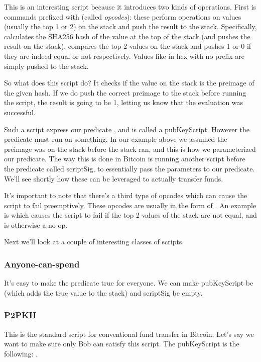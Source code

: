 This is an interesting script because it introduces two kinds of operations. First is commands prefixed with  (called \emph{opcodes}): these perform operations on values (usually the top 1 or 2) on the stack and push the result to the stack. Specifically,  calculates the SHA256 hash of the value at the top of the stack (and pushes the result on the stack).  compares the top 2 values on the stack and pushes 1 or 0 if they are indeed equal or not respectively. Values like  in hex with no  prefix are simply pushed to the stack.


So what does this script do? It checks if the value on the stack is the preimage of the given hash. If we do push the correct preimage to the stack before running the script, the result is going to be 1, letting us know that the evaluation was successful.

Such a script express  our predicate , and is called a \textsf{pubKeyScript}. However the predicate must run on something. In our example above we assumed the preimage was on the stack before the stack ran, and this is how we parameterized our predicate. The way this is done in Bitcoin is running another script before the predicate called \textsf{scriptSig}, to essentially pass the parameters to our predicate. We'll see shortly how these can be leveraged to actually transfer funds.

It's important to note that there's a third type of opcodes which can cause the script to fail preemptively. These opcodes are usually in the form of . An example is  which causes the script to fail if the top 2 values of the stack are not equal, and is otherwise a no-op.

Next we'll look at a couple of interesting classes of scripts.

\subsubsection{Anyone-can-spend}
It's easy to make the predicate true for everyone. We can make \textsf{pubKeyScript} be  (which adds the true value to the stack) and \textsf{scriptSig} be empty.

\subsubsection{P2PKH}
This is the standard script for conventional fund transfer in Bitcoin. Let's say we want to make sure only Bob can satisfy this script. The \textsf{pubKeyScript} is the following: .

